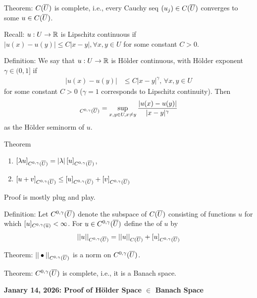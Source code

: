 \documentclass[12pt,a4paper]{report}
\newcommand{\CSPACE}{{C(\CONJ{U})}}
\newcommand{\CNORM}[1]{|| #1 ||_\CSPACE}
\newcommand{\CSUBSPACE}[3]{C^{#1,#2}(#3)}
\newcommand{\HSPACE}[3]{C^{#1,#2}(#3)}
\newcommand{\HOLDERNORM}[4]{|| #4 ||_{\HSPACE{#1}{#2}{#3}}}
\newcommand{\HSEMINORM}[4]{[ #4 ]_{\HSPACE{#1}{#2}{#3}}}
\begin{document}
\begin{description}
	\item Theorem: $\CSPACE$ is complete, i.e., every Cauchy seq $(u_j) \in \CSPACE$ converges to some $u \in \CSPACE$.
	
	Recall: $u:U \to \mathbb{R}$ is Lipschitz continuous if $|u(x)-u(y)| \le C|x-y|, \forall x,y \in U$ for some constant $C > 0$.
	
	\item Definition: We say that $u:U\to \mathbb{R}$ is H\"older continuous, with H\"older exponent $\gamma \in (0,1]$ if
	\begin{align*}
		|u(x)-u(y)| &\le C|x-y|^\gamma, \, \forall x,y \in U
	\end{align*}for some constant $C>0$ ($\gamma=1$ corresponds to Lipschitz continuity).  Then
	\begin{align*}
		\HSEMINORM{0}{\gamma}{\CONJ{U}}{u} = \sup_{x,y \in U,x\ne y}\frac{|u(x)-u(y)|}{|x-y|^\gamma}
	\end{align*}as the H\"older seminorm of $u$.
	
	\item Theorem \begin{enumerate}
		\item $\HSEMINORM{0}{\gamma}{\CONJ{U}}{\lambda u} = |\lambda|\,\HSEMINORM{0}{\gamma}{\CONJ{U}}{u}$,
		\item $\HSEMINORM{0}{\gamma}{\CONJ{U}}{u+v} \le\HSEMINORM{0}{\gamma}{\CONJ{U}}{u} + \HSEMINORM{0}{\gamma}{\CONJ{U}}{v}$
	\end{enumerate}
	
	Proof is mostly plug and play.
	
	\item Definition: Let $\CSUBSPACE{0}{\gamma}{\CONJ{U}}$ denote the subspace of $\CSPACE$ consisting of functions $u$ for which $\HSEMINORM{0}{\gamma}{\CONJ{u}}{u}<\infty$.  For $u \in \CSUBSPACE{0}{\gamma}{\CONJ{U}}$ define the  of $u$ by 
	\begin{align*}
		\HOLDERNORM{0}{\gamma}{\CONJ{U}}{u} = \CNORM{u}+\HSEMINORM{0}{\gamma}{\CONJ{U}}{u}
	\end{align*}
	
	\item Theorem: $\HOLDERNORM{0}{\gamma}{\CONJ{U}}{\bullet}$ is a norm on $\CSUBSPACE{0}{\gamma}{\CONJ{U}}$.
	
	\item Theorem: $\CSUBSPACE{0}{\gamma}{\CONJ{U}}$ is complete, i.e., it is a Banach space.
\end{description}

\HLINE
\textbf{\large{Janary 14, 2026: Proof of H\"older Space $\in$ Banach Space}}
\end{document}
